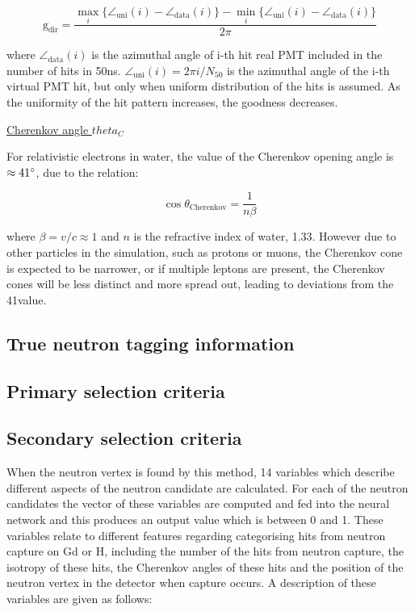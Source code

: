 \begin{equation}
    \mathrm{g}_{\mathrm{dir}}=\frac{\max _{i}\{\angle_{\mathrm{uni}}(i)-\angle_{\mathrm{data}}(i)\}-\min _{i}\{\angle_{\mathrm{uni}}(i)-\angle_{\mathrm{data}}(i)\}}{2 \pi}
\label{direction_goodness}
\end{equation}

where $\angle_{\mathrm{data}}(i)$ is the azimuthal angle of i-th hit real PMT included in the number of hits in 50ns. $\angle_{\mathrm{uni}}(i)=2 \pi i / N_{50}$ is the azimuthal angle of the i-th virtual PMT hit, but only when uniform distribution of the hits is assumed. As the uniformity of the hit pattern increases, the goodness decreases. 
 



 \underline{Cherenkov angle $theta_{C}$}

 For relativistic electrons in water, the value of the Cherenkov opening angle is $\approx 41\degree$, due to the relation: 

 \begin{equation}
\cos \theta_{\mathrm{Cherenkov}}=\frac{1}{n\beta}
\label{cherenkov_angle}
\end{equation}
 
where $\beta = v/c \approx 1$ and $n$ is the refractive index of water, 1.33. However due to other particles in the simulation, such as protons or muons, the Cherenkov cone is expected to be narrower, or if multiple leptons are present, the Cherenkov cones will be less distinct and more spread out, leading to deviations from the 41\degree value. 


\subsection{True neutron tagging information}
\subsection{Primary selection criteria}
\subsection{Secondary selection criteria}
When the neutron vertex is found by this method, 14 variables which describe different aspects of the neutron candidate are calculated. For each of the neutron candidates the vector of these variables are computed and fed into the neural network and this produces an output value which is between 0 and 1. These variables relate to different features regarding categorising hits from neutron capture on Gd or H, including the number of the hits from neutron capture, the isotropy of these hits, the Cherenkov angles of these hits and the position of the neutron vertex in the detector when capture occurs. A description of these variables are given as follows:


